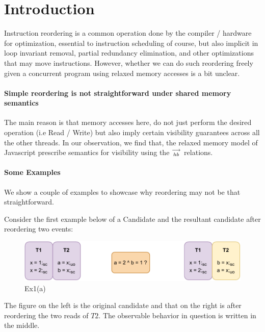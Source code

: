 
\section{Introduction}
    Instruction reordering is a common operation done by the compiler / hardware for optimization, essential to instruction scheduling of course, but also implicit in loop invariant removal, partial redundancy elimination, and other optimizations that may move instructions. 
    However, whether we can do such reordering freely given a concurrent program using relaxed memory accesses is a bit unclear. 
     
    \paragraph{Simple reordering is not straightforward under shared memory semantics}
    The main reason is that memory accesses here, do not just perform the desired operation (i.e Read / Write) but also imply certain visibility guarantees across all the other threads.  
    In our observation, we find that, the relaxed memory model of Javascript prescribe semantics for visibility using the $\stackrel{\longrightarrow}{_{hb}}$ relations. 
    
    \paragraph{Some Examples}

        We show a couple of examples to showcase why reordering may not be that straightforward. 

        Consider the first example below of a Candidate and the resultant candidate after reordering two events:
        
        \begin{figure}[H]
            \centering
            \includegraphics[scale=0.7]{5.InstructionReordering/ReorderingExample1(a).pdf}
            \caption{Ex1(a)} 
        \end{figure}

        The figure on the left is the original candidate and that on the right is after reordering the two reads of $T2$.
        The observable behavior in question is written in the middle. 

